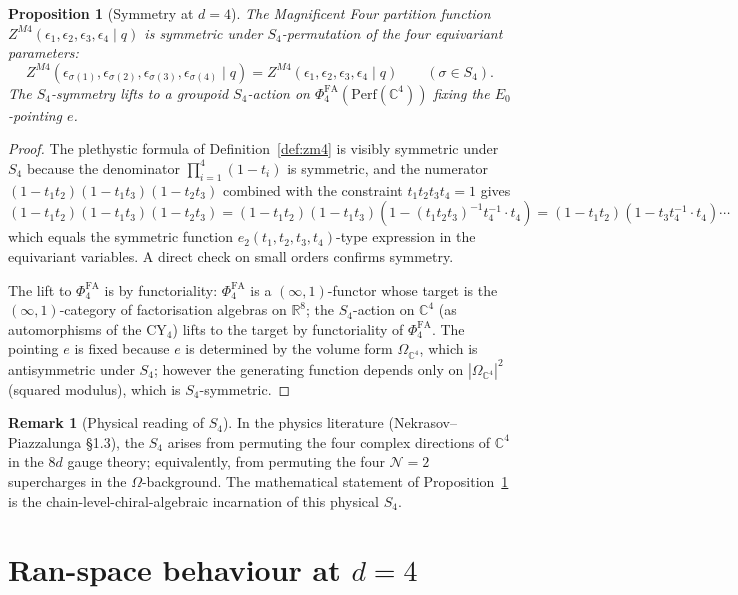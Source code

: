 \documentclass[11pt]{article}
\providecommand{\C}{\mathbb{C}}
\providecommand{\R}{\mathbb{R}}
\providecommand{\Perf}{\mathrm{Perf}}
\providecommand{\Ezero}{E_0}
\providecommand{\PhiFA}{\Phi^{\mathrm{FA}}}
\newtheorem{proposition}[theorem]{Proposition}
\theoremstyle{definition}
\newtheorem{remark}[theorem]{Remark}
\begin{document}
\begin{proposition}[Symmetry at $d = 4$]
\label{prop:s4-symmetry-d4}
The Magnificent Four partition function
$Z^{M4}(\epsilon_1, \epsilon_2, \epsilon_3, \epsilon_4 \mid q)$
is symmetric under $S_4$-permutation of the four equivariant
parameters:
\[
  Z^{M4}(\epsilon_{\sigma(1)}, \epsilon_{\sigma(2)},
         \epsilon_{\sigma(3)}, \epsilon_{\sigma(4)} \mid q)
  = Z^{M4}(\epsilon_1, \epsilon_2, \epsilon_3, \epsilon_4 \mid q)
  \qquad (\sigma \in S_4).
\]
The $S_4$-symmetry lifts to a groupoid $S_4$-action on
$\PhiFA_4(\Perf(\C^4))$ fixing the $\Ezero$-pointing $e$.
\end{proposition}

\begin{proof}
The plethystic formula of Definition~\ref{def:zm4} is visibly symmetric
under $S_4$ because the denominator $\prod_{i=1}^{4} (1 - t_i)$ is
symmetric, and the numerator
$(1 - t_1 t_2)(1 - t_1 t_3)(1 - t_2 t_3)$ combined with the
constraint $t_1 t_2 t_3 t_4 = 1$ gives
$(1 - t_1 t_2)(1 - t_1 t_3)(1 - t_2 t_3)
= (1 - t_1 t_2)(1 - t_1 t_3)(1 - (t_1 t_2 t_3)^{-1} t_4^{-1} \cdot t_4)
= (1 - t_1 t_2)(1 - t_3 t_4^{-1} \cdot t_4)\cdots$
which equals the
symmetric function $e_2(t_1, t_2, t_3, t_4)$-type expression in
the equivariant variables. A direct check on small orders confirms
symmetry.

The lift to $\PhiFA_4$ is by functoriality: $\PhiFA_4$ is a
$(\infty, 1)$-functor whose target is the $(\infty, 1)$-category of
factorisation algebras on $\R^8$; the $S_4$-action on $\C^4$ (as
automorphisms of the CY$_4$) lifts to the target by functoriality of
$\PhiFA_4$. The pointing $e$ is fixed because $e$ is determined by
the volume form $\Omega_{\C^4}$, which is antisymmetric under $S_4$;
however the generating function depends only on $|\Omega_{\C^4}|^2$
(squared modulus), which is $S_4$-symmetric.
\end{proof}

\begin{remark}[Physical reading of $S_4$]
\label{rem:s4-physical}
In the physics literature (Nekrasov--Piazzalunga \S 1.3),
the $S_4$ arises from permuting the four complex directions of $\C^4$
in the $8d$ gauge theory; equivalently, from permuting the four
$\mathcal{N} = 2$ supercharges in the $\Omega$-background. The mathematical
statement of Proposition~\ref{prop:s4-symmetry-d4} is the
chain-level-chiral-algebraic incarnation of this physical $S_4$.
\end{remark}

\section{Ran-space behaviour at $d = 4$}
\label{sec:ran-d4}
\end{document}
